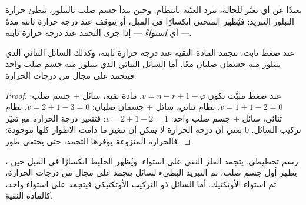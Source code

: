 بعيدًا عن أي تغيّر للحالة، تبرد العيّنة بانتظام. وحين يبدأ جسم صلب
بالتبلور، تبطئ حرارة التبلور التبريد: فيُظهر المنحنى
انكسارًا في الميل، أو يتوقف عند درجة حرارة ثابتة مدةً --- أي
\textit{استواءً} --- إذا جرى التجمد عند درجة حرارة ثابتة.

\begin{proposition}[الاستواءات]\label{prop:b2:solid-liquid-diagrams:plateaus}
عند ضغط ثابت، تتجمد المادة النقية عند درجة حرارة ثابتة، وكذلك
السائل الثنائي الذي يتبلور منه جسمان صلبان معًا. أما السائل الثنائي
الذي يتبلور منه جسم صلب واحد فيتجمد على مجال من درجات الحرارة.
\end{proposition}

\begin{proof}
عند ضغط مثبَّت تكون  $v = n - r + 1 - \varphi$. مادة
نقية، سائل + جسم صلب: $v = 1 + 1 - 2 = 0$. نظام ثنائي، سائل + جسمان صلبان:
$v = 2 + 1 - 3 = 0$. نظام ثنائي، سائل + جسم صلب واحد: $v = 2 + 1 - 2 = 1$: فتتغير
درجة الحرارة مع تغيّر تركيب السائل.  0 تعني أن درجة
الحرارة لا يمكن أن تتغير ما دامت الأطوار كلها موجودة: فالحرارة المنزوعة
يوفرها التجمد، حتى يختفي طور.
\end{proof}

\begin{omfigure}

{\small {}، رسم تخطيطي. يتجمد الفلز النقي على استواء. ويُظهر
الخليط انكسارًا في الميل حين يظهر أول جسم صلب، ثم التبريد
البطيء لسائل يتجمد على مجال من درجات الحرارة، ثم
استواء الأوتكتيك. أما السائل ذو التركيب الأوتكتيكي فيتجمد على
استواء واحد، كالمادة النقية.}
\end{omfigure}

